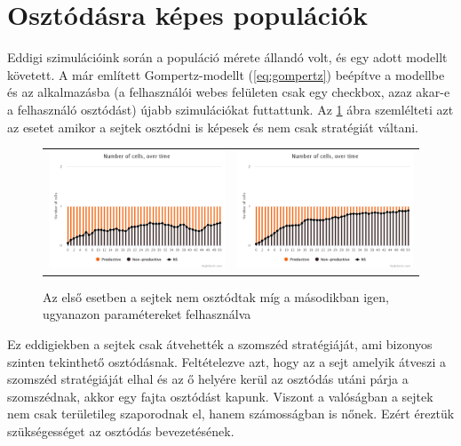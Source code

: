 \section{Osztódásra képes populációk}

Eddigi szimulációink során a populáció mérete állandó volt, és egy adott modellt követett. A már említett Gompertz-modellt (\ref{eq:gompertz}) beépítve a modellbe és az alkalmazásba (a felhasználói webes felületen csak egy checkbox, azaz akar-e a felhasználó osztódást) újabb szimulációkat futtattunk. Az \ref{fig:Divide} ábra szemlélteti azt az esetet amikor a sejtek osztódni is képesek és nem csak stratégiát váltani. 

\begin{figure}[ht!]
	\centering
	\begin{tabular}{cc}
		\includegraphics[width=0.47\linewidth]{images/nemosztodik}
		&
		\includegraphics[width=0.47\linewidth]{images/osztodik}
	\end{tabular}
	\captionsetup{justification=centering}
	\caption{Az első esetben a sejtek nem osztódtak míg a másodikban igen, ugyanazon paramétereket felhasználva}
	\label{fig:Divide}
\end{figure}


Ez eddigiekben a sejtek csak átvehették a szomszéd stratégiáját, ami bizonyos szinten tekinthető osztódásnak. Feltételezve azt, hogy az a sejt amelyik átveszi a szomszéd stratégiáját elhal és az ő helyére kerül az osztódás utáni párja a szomszédnak, akkor egy fajta osztódást kapunk. Viszont a valóságban a sejtek nem csak területileg szaporodnak el, hanem számosságban is nőnek. Ezért éreztük szükségességet az osztódás bevezetésének.

